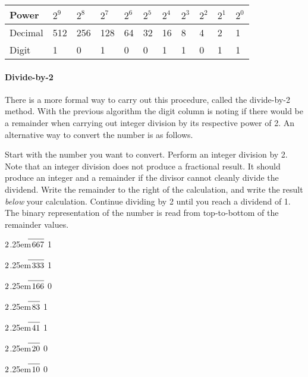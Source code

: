 \documentclass[11pt]{book}
\newcommand\Mydiv[2]{%
$\strut#1$\kern.25em\smash{\raise.3ex\hbox{$\big)$}}$\mkern-8mu
        \overline{\enspace\strut#2}$}
\begin{document}
\vspace{1em}
\begin{tabular}{|l|l|l|l|l|l|l|l|l|l|l|}\hline
Power & $2^9$ & $2^8$ & $2^7$ & $2^6$ & $2^5$ & $2^4$ & $2^3$ & $2^2$ & $2^1$ & $2^0$ \\\hline\hline
Decimal & 512 & 256 & 128 & 64 & 32 & 16 & 8 & 4 & 2 & 1 \\\hline
Digit & 1 & 0 & 1 & 0 & 0 & 1 & 1 & 0 & 1 & 1 \\\hline
\end{tabular}

\vspace{1em}

\paragraph{Divide-by-2} %
There is a more formal way to carry out this procedure, called the divide-by-2 method. With the previous algorithm the digit column is noting if there would be a remainder when carrying out integer division by its respective power of 2. An alternative way to convert the number is as follows.

Start with the number you want to convert. Perform an integer division by 2. Note that an integer division does not produce a fractional result. It should produce an integer and a remainder if the divisor cannot cleanly divide the dividend. Write the remainder to the right of the calculation, and write the result \textit{below} your calculation. Continue dividing by 2 until you reach a dividend of 1. The binary representation of the number is read from top-to-bottom of the remainder values.

\vspace{1em}

 \Mydiv{2}{667} \hspace{1cm} 1
 
 \Mydiv{2}{333} \hspace{1cm} 1
 
 \Mydiv{2}{166} \hspace{1cm} 0
 
 \Mydiv{2}{83} \hspace{1.2cm} 1
 
 \Mydiv{2}{41} \hspace{1.2cm} 1
 
 \Mydiv{2}{20} \hspace{1.2cm} 0
 
 \Mydiv{2}{10} \hspace{1.2cm} 0
 
\end{document}
